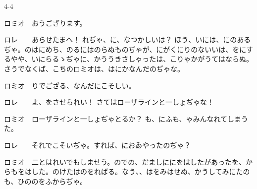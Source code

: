 \documentclass[tate,paper=b6j,jafontsize=9pt]{jlreq}
\begin{document}
\begin{azconvIndented}{4\zw}{-4\zw}

ロミオ　おうござります。

ロレ　　あらせたまへ！ れぢゃ、に、なつかしいは？ ほう、いには、にのあるぢゃ。のはにめち、のるにはのらぬものぢゃが、にがくにりのないいは、をにするやや、いにらるゝぢゃに、かううきさしゃったは、こりゃかがうてはならぬ。さうでなくば、こちのロミオは、はにかなんだのぢゃな。

ロミオ　りでござる、なんだにこそしい。

ロレ　　よ、をさせられい！ さてはローザラインと一しょぢゃな！

ロミオ　ローザラインと一しょぢゃとるか？ も、にふも、ゃみんなれてしまうた。

ロレ　　それでこそいぢゃ。すれば、におゐやったのぢゃ？

ロミオ　二とはれいでもしませう。のでの、だましににをはしたがあったを、からもをはした。のけたはのをればる。なう、、はをみはせぬ、かうしてみにたのも、ひののをふからぢゃ。


\end{azconvIndented}
\end{document}

